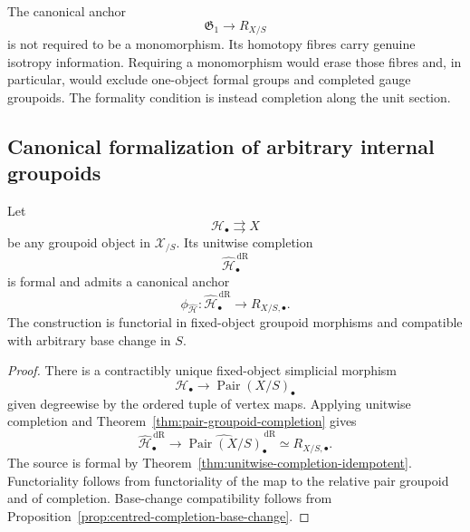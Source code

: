 \begin{remark}
\label{rem:no-mono-formal-gpd}
The canonical anchor
\[
    \mathfrak G_1\longrightarrow R_{X/S}
\]
is not required to be a monomorphism.  Its homotopy fibres carry genuine
isotropy information.  Requiring a monomorphism would erase those fibres and,
in particular, would exclude one-object formal groups and completed gauge
groupoids.  The formality condition is instead completion along the unit
section.
\end{remark}

\subsection{Canonical formalization of arbitrary internal groupoids}

\begin{theorem}
\label{thm:unitwise-formal-groupoid-completion}
Let
\[
    \mathcal H_\bullet\rightrightarrows X
\]
be any groupoid object in $\mathcal X_{/S}$.  Its unitwise completion
\[
    \widehat{\mathcal H}^{\,\mathrm{dR}}_\bullet
\]
is formal and admits a canonical anchor
\[
    \phi_{\widehat{\mathcal H}}:
    \widehat{\mathcal H}^{\,\mathrm{dR}}_\bullet
    \longrightarrow
    R_{X/S,\bullet}.
\]
The construction is functorial in fixed-object groupoid morphisms and
compatible with arbitrary base change in $S$.
\end{theorem}

\begin{proof}
There is a contractibly unique fixed-object simplicial morphism
\[
    \mathcal H_\bullet
    \longrightarrow
    \operatorname{Pair}(X/S)_\bullet
\]
given degreewise by the ordered tuple of vertex maps.  Applying unitwise
completion and Theorem~\ref{thm:pair-groupoid-completion} gives
\[
    \widehat{\mathcal H}^{\,\mathrm{dR}}_\bullet
    \longrightarrow
    \widehat{\operatorname{Pair}(X/S)}^{\,\mathrm{dR}}_\bullet
    \simeq
    R_{X/S,\bullet}.
\]
The source is formal by
Theorem~\ref{thm:unitwise-completion-idempotent}.  Functoriality follows from
functoriality of the map to the relative pair groupoid and of completion.
Base-change compatibility follows from
Proposition~\ref{prop:centred-completion-base-change}.
\end{proof}

